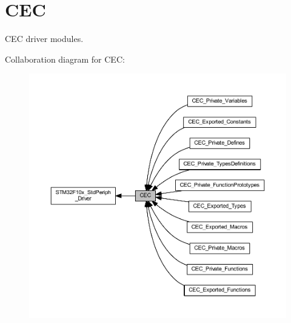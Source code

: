 \hypertarget{group___c_e_c}{}\section{C\+EC}
\label{group___c_e_c}


C\+EC driver modules.  


Collaboration diagram for C\+EC\+:
\nopagebreak
\begin{figure}[H]
\begin{center}
\leavevmode
\includegraphics[width=350pt]{group___c_e_c}
\end{center}
\end{figure}
